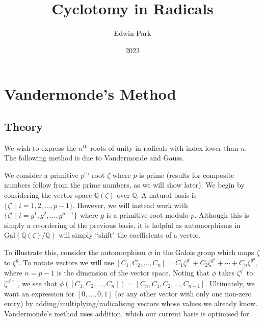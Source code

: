 \documentclass{article}
\title{Cyclotomy in Radicals}
\author{Edwin Park}
\date{2023}
\renewcommand\({\left(}
\renewcommand\){\right)}
\begin{document}
\clearpage\maketitle\thispagestyle{empty}
\newpage
\tableofcontents
\newpage\setcounter{page}{1}
\section{Vandermonde's Method}
\subsection{Theory}
We wish to express the $n^\text{th}$ roots of unity in radicals with index lower than $n$. The following method is due to Vandermonde and Gauss.

\vspace{6mm}
We consider a primitive $p^\text{th}$ root $\zeta$ where $p$ is prime (results for composite numbers follow from the prime numbers, as we will show later). We begin by considering the vector space $\mathbb{Q}(\zeta)$ over $\mathbb{Q}$. A natural basis is $\{\zeta^i\mid i=1,2,\ldots,p-1\}$. However, we will instead work with $\{\zeta^i\mid i=g^1,g^2,\ldots,g^{p-1}\}$ where $g$ is a primitive root modulo $p$. Although this is simply a re-ordering of the previous basis, it is helpful as automorphisms in $\text{Gal}(\mathbb{Q}(\zeta)/\mathbb{Q})$ will simply ``shift" the coefficients of a vector. 

\vspace{6mm}
To illustrate this, consider the automorphism $\phi$ in the Galois group which maps $\zeta$ to $\zeta^g$. To notate vectors we will use $[C_1,C_2,\ldots,C_n]=C_1\zeta^{g^1}+C_2\zeta^{g^2}+\cdots+C_n\zeta^{g^n}$, where $n=p-1$ is the dimension of the vector space. Noting that $\phi$ takes $\zeta^{g^i}$ to $\zeta^{g^{i+1}}$, we see that $\phi\left([C_1,C_2,\ldots,C_n]\right)=[C_n,C_1,C_2,\ldots,C_{n-1}]$. Ultimately, we want an expression for $[0,\ldots,0,1]$ (or any other vector with only one non-zero entry) by adding/multiplying/radicalising vectors whose values we already know. Vandermonde's method uses addition, which our current basis is optimised for.
\end{document}
